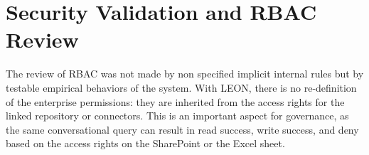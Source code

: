 \section{\textcolor[HTML]{0066CC}{Security Validation and RBAC Review}}

The review of RBAC was not made by non specified implicit internal rules but by testable empirical behaviors of the system. With LEON, there is no re-definition of the enterprise permissions: they are inherited from the access rights for the linked repository or connectors. This is an important aspect for governance, as the same conversational query can result in read success, write success, and deny based on the access rights on the SharePoint or the Excel sheet.\\

